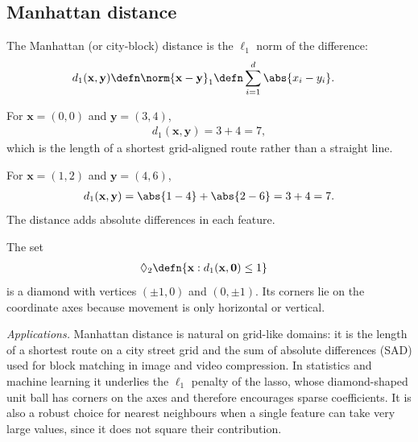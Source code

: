 \documentclass[a4paper, 12pt]{book}
\begin{document}
\subsection{Manhattan distance}
\begin{definition}
    The Manhattan (or city-block) distance is the $\ell_1$ norm of the difference:
    \begin{align}
        d_1(\mathbf{x},\mathbf{y}) &\defn \norm{\mathbf{x}-\mathbf{y}}_1
        \defn \sum_{i=1}^d \abs{x_i-y_i}.
    \end{align}
\end{definition}

\begin{example}
    For $\mathbf{x}=(0,0)$ and $\mathbf{y}=(3,4)$,
    \begin{align}
        d_1(\mathbf{x},\mathbf{y})=3+4=7,
    \end{align}
    which is the length of a shortest grid-aligned route rather than a straight line.
\end{example}

\begin{example}
    For $\mathbf{x}=(1,2)$ and $\mathbf{y}=(4,6)$,
    \begin{align}
        d_1(\mathbf{x},\mathbf{y})=\abs{1-4}+\abs{2-6}=3+4=7.
    \end{align}
    The distance adds absolute differences in each feature.
\end{example}

\begin{example}
    The set 
    \begin{align}
        \lozenge_2 &\defn \{\mathbf{x}:d_1(\mathbf{x},\mathbf{0})\leq1\}    
    \end{align}
    is a diamond with vertices $(\pm1,0)$ and $(0,\pm1)$. Its corners lie on the coordinate axes because movement is only horizontal or vertical.
\end{example}

\emph{Applications.} Manhattan distance is natural on grid-like domains: it is the length of a shortest route on a city street grid and the sum of absolute differences (SAD) used for block matching in image and video compression. In statistics and machine learning it underlies the $\ell_1$ penalty of the lasso, whose diamond-shaped unit ball has corners on the axes and therefore encourages sparse coefficients. It is also a robust choice for nearest neighbours when a single feature can take very large values, since it does not square their contribution.
\end{document}
